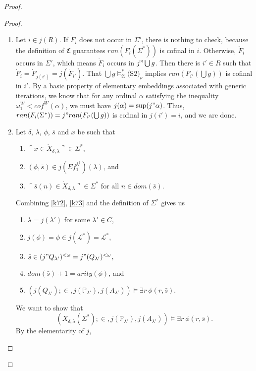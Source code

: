 \documentclass[12pt, twoside]{memoir}
\numberwithin{equation}{section}
\theoremstyle{definition}
\theoremstyle{remark}
\theoremstyle{definition}
\theoremstyle{definition}
\theoremstyle{definition}
\theoremstyle{remark}
\newcommand{\eq}{=}
\begin{document}
\begin{proof}
\begin{proof}
\begin{enumerate}[label=<$k$> $\eq$ \arabic* :, leftmargin=70pt]
    \addtocounter{enumi}{1}
    \item Let $i \in j(R)$. If $\dot{F}_i$ does not occur in $\Sigma'$, there is nothing to check, because the definition of $\mathfrak{C}$ guarantees $ran(F_i(\Sigma^*))$ is cofinal in $i$. Otherwise, $\dot{F}_i$ occurs in $\Sigma'$, which means $\dot{F}_i$ occurs in $j" \bigcup g$. Then there is $i' \in R$ such that $\dot{F}_i = \dot{F}_{j(i')} = j(\dot{F}_{i'})$. That $\bigcup g \models^*_{\mathfrak{A}} \hyperref[c2]{\text{(S2)}_{\nu}}$ implies $ran(F_{i'}(\bigcup g))$ is cofinal in $i'$. By a basic property of elementary embeddings associated with generic iterations, we know that for any ordinal $\alpha$ satisfying the inequality $\omega_1^W < cof^{W}(\alpha)$, we must have $j(\alpha) = \mathrm{sup}(j" \alpha)$. Thus, $ran(F_i(\Sigma^*)) = j" ran(F_{i'}(\bigcup g))$ is cofinal in $j(i') = i$, and we are done.
    \addtocounter{enumi}{4}
    \item\label{k7m} Let $\delta$, $\lambda$, $\phi$, $\bar{s}$ and $x$ be such that 
    \begin{enumerate}[label=(K7.\arabic*), leftmargin=50pt]
        \item $\ulcorner x \in \dot{X}_{\delta, \lambda} \urcorner \in \Sigma^*$,
        \item\label{k72} $(\phi, \bar{s}) \in j(Ef_1^{\lambda^{\dagger}})(\lambda)$, and
        \item\label{k73} $\ulcorner \bar{s}(n) \in \dot{X}_{\delta, \lambda} \urcorner \in \Sigma^*$ for all $n \in dom(\bar{s})$.
    \end{enumerate}
    Combining \ref{k72}, \ref{k73} and the definition of $\Sigma^*$ gives us 
    \begin{enumerate}[label=(\alph*)]
        \item $\lambda = j(\lambda')$ for some $\lambda' \in C$,
        \item $j(\phi) = \phi \in j(\mathcal{L}^*) = \mathcal{L}^*$,
        \item $\bar{s} \in (j" Q_{\lambda'})^{< \omega} = j" (Q_{\lambda'})^{< \omega}$,
        \item $dom(\bar{s}) + 1 = arity(\phi)$, and
        \item $(j(Q_{\lambda'}); \in, j(\mathbb{P}_{\lambda'}), j(A_{\lambda'})) \models \exists r \ \phi(r, \bar{s})$.
    \end{enumerate}
    We want to show that $$(X_{\delta, \lambda}(\Sigma^*); \in, j(\mathbb{P}_{\lambda'}), j(A_{\lambda'})) \models \exists r \ \phi(r, \bar{s}).$$ By the elementarity of $j$, 

\end{enumerate}
\end{proof}
\end{proof}
\end{document}
